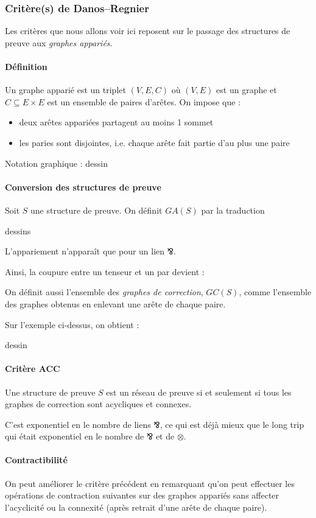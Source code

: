 \documentclass[a4paper, 11pt]{article}
\newcommand{\parr}{\mathbin{⅋}}
\begin{document}
\subsubsection{Critère(s) de Danos--Regnier}

Les critères que nous allons voir ici reposent sur le passage des structures de preuve aux \emph{graphes appariés}.

\paragraph{Définition} Un graphe apparié est un triplet $(V, E, C)$ où $(V,E)$ est un graphe et $C \subseteq E \times E$ est un ensemble de paires d'arêtes. On impose que :
\begin{itemize}
\item deux arêtes appariées partagent au moins 1 sommet
\item les paries sont disjointes, i.e. chaque arête fait partie d'au plus une paire
\end{itemize}
Notation graphique : dessin

\paragraph{Conversion des structures de preuve} Soit $S$ une structure de preuve. On définit $GA(S)$ par la traduction

dessins

L'appariement n'apparaît que pour un lien $\parr$.

Ainsi, la coupure entre un tenseur et un par devient :

On définit aussi l'ensemble des \emph{graphes de correction}, $GC(S)$, comme l'ensemble des graphes obtenus en enlevant une arête de chaque paire.

Sur l'exemple ci-dessus, on obtient :

dessin

\paragraph{Critère ACC} Une structure de preuve $S$ est un réseau de preuve si et seulement si tous les graphes de correction sont acycliques et connexes.

C'est exponentiel en le nombre de liens $\parr$, ce qui est déjà mieux que le long trip qui était exponentiel en le nombre de $\parr$ et de $\otimes$.

\paragraph{Contractibilité} On peut améliorer le critère précédent en remarquant qu'on peut effectuer les opérations de contraction suivantes sur des graphes appariés sans affecter l'acyclicité ou la connexité (après retrait d'une arête de chaque paire).
\end{document}
